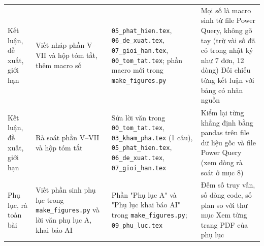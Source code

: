 {\begin{longtable}{@{}L{2.1cm} L{3.6cm} L{4.2cm} L{5.2cm}@{}}
Kết luận, đề xuất, giới hạn & Viết nháp phần V–VII và hộp tóm tắt, thêm macro số & \texttt{05\_\allowbreak{}phat\_\allowbreak{}hien.\allowbreak{}tex}, \texttt{06\_\allowbreak{}de\_\allowbreak{}xuat.\allowbreak{}tex}, \texttt{07\_\allowbreak{}gioi\_\allowbreak{}han.\allowbreak{}tex}, \texttt{00\_\allowbreak{}tom\_\allowbreak{}tat.\allowbreak{}tex}; phần macro mới trong \texttt{make\_\allowbreak{}figures.\allowbreak{}py} & \textbullet{} Mọi số là macro sinh từ file Power Query, không gõ tay (trừ vài số đã có trong nhật ký như 7 đơn, 12 dòng) \newline \textbullet{} Đối chiếu từng kết luận với bảng có nhãn nguồn \\
Kết luận, đề xuất, giới hạn & Rà soát phần V–VII và hộp tóm tắt & Sửa lời văn trong \texttt{00\_\allowbreak{}tom\_\allowbreak{}tat.\allowbreak{}tex}, \texttt{03\_\allowbreak{}kham\_\allowbreak{}pha.\allowbreak{}tex} (1 câu), \texttt{05\_\allowbreak{}phat\_\allowbreak{}hien.\allowbreak{}tex}, \texttt{06\_\allowbreak{}de\_\allowbreak{}xuat.\allowbreak{}tex}, \texttt{07\_\allowbreak{}gioi\_\allowbreak{}han.\allowbreak{}tex} & Kiểm lại từng khẳng định bằng pandas trên file dữ liệu gốc và file Power Query (xem dòng rà soát ở mục 8) \\
Phụ lục, rà toàn bài & Viết phần sinh phụ lục trong \texttt{make\_\allowbreak{}figures.\allowbreak{}py} và lời văn phụ lục A, khai báo AI & Phần "Phụ lục A" và "Phụ lục khai báo AI" trong \texttt{make\_\allowbreak{}figures.\allowbreak{}py}; \texttt{09\_\allowbreak{}phu\_\allowbreak{}luc.\allowbreak{}tex} & \textbullet{} Đếm số truy vấn, số dòng code, số plan so với thư mục \newline \textbullet{} Xem từng trang PDF của phụ lục \\
\bottomrule
\end{longtable}}
